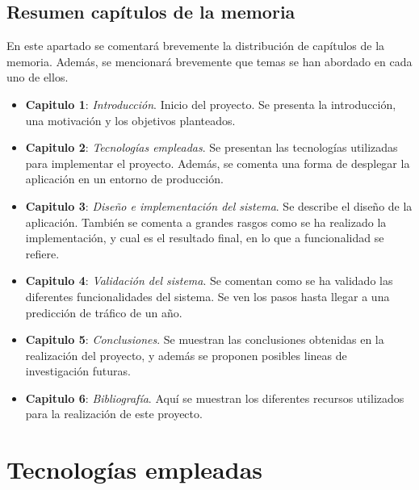 \documentclass[a4paper, oneside, 12pt]{book}
\begin{document}
	\section{Resumen capítulos de la memoria}
	
	\noindent En este apartado se comentará brevemente la distribución de capítulos de la memoria. Además, se mencionará brevemente que temas se han abordado en cada uno de ellos. \\
	
	\begin{itemize}
		\item \textbf{Capitulo 1}: \textit{Introducción}. Inicio del proyecto. Se presenta la introducción, una motivación y los objetivos planteados. \\
		
		\item \textbf{Capitulo 2}: \textit{Tecnologías empleadas}. Se presentan las tecnologías utilizadas para implementar el proyecto. Además, se comenta una forma de desplegar la aplicación en un entorno de producción. \\
		
		\pagebreak
		
		\item \textbf{Capitulo 3}: \textit{Diseño e implementación del sistema}. Se describe el diseño de la aplicación. También se comenta a grandes rasgos como se ha realizado la implementación, y cual es el resultado final, en lo que a funcionalidad se refiere. \\
		
		\item \textbf{Capitulo 4}: \textit{Validación del sistema}. Se comentan como se ha validado las diferentes funcionalidades del sistema. Se ven los pasos hasta llegar a una predicción de tráfico de un año. \\
		
		\item \textbf{Capitulo 5}: \textit{Conclusiones}. Se muestran las conclusiones obtenidas en la realización del proyecto, y además se proponen posibles lineas de investigación futuras. \\
		
		\item \textbf{Capitulo 6}: \textit{Bibliografía}. Aquí se muestran los diferentes recursos utilizados para la realización de este proyecto.
	\end{itemize}
	
	\pagebreak
	
	\chapter{Tecnologías empleadas}
	
\end{document}
